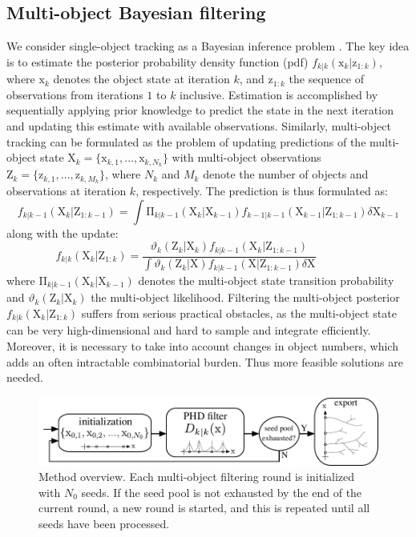 \subsection{Multi-object Bayesian filtering} 
\label{ssec:multi-obj-bay-filt}
We consider single-object tracking as a Bayesian inference problem \cite{bar2004estimation, sarkka2013bayesian}. The key idea is to estimate the posterior probability density function (pdf) $f_{k|k}(\mathrm{x}_k | \mathrm{z}_{1:k})$, where $\mathrm{x}_k$ denotes the object state at iteration $k$, and $\mathrm{z}_{1:k}$ the sequence of observations from iterations $1$ to $k$ inclusive. Estimation is accomplished by sequentially applying prior knowledge to predict the state in the next iteration and updating this estimate with available observations. Similarly, multi-object tracking can be formulated as the problem of updating predictions of the multi-object state $\mathrm{X}_k = \{\mathrm{x}_{k,1},\ldots,\mathrm{x}_{k,N_k}\}$ with multi-object observations $\mathrm{Z}_k = \{\mathrm{z}_{k,1},\ldots,\mathrm{z}_{k,M_k}\}$, where $N_k$ and $M_k$ denote the number of objects and observations at iteration $k$, respectively. The prediction is thus formulated as:
\begin{equation}
f_{k|k-1}(\mathrm{X}_k | \mathrm{Z}_{1:k-1}) = 
\int\!\mathrm{\Pi}_{k|k-1}(\mathrm{X}_k | \mathrm{X}_{k-1}) f_{k-1|k-1}(\mathrm{X}_{k-1}|\mathrm{Z}_{1:k-1}) \delta\mathrm{X}_{k-1}
\label{eq:prediction}
\end{equation}
along with the update:
\begin{equation}
f_{k|k}(\mathrm{X}_k|\mathrm{Z}_{1:k}) =
\frac{\vartheta_k(\mathrm{Z}_k|\mathrm{X}_k) f_{k|k-1}(\mathrm{X}_k|\mathrm{Z}_{1:k-1})}{\int\!\vartheta_k(\mathrm{Z}_k|\mathrm{X})f_{k|k-1}(\mathrm{X}|\mathrm{Z}_{1:k-1}) \delta\mathrm{X}}\qquad\qquad
\label{eq:update}
\end{equation}
where $\mathrm{\Pi}_{k|k-1}(\mathrm{X}_k | \mathrm{X}_{k-1})$ denotes the multi-object state transition probability and $\vartheta_k(\mathrm{Z}_k|\mathrm{X}_k)$ the multi-object likelihood. Filtering the multi-object posterior $f_{k|k}(\mathrm{X}_k | \mathrm{Z}_{1:k})$ suffers from serious practical obstacles, as the multi-object state can be very high-dimensional and hard to sample and integrate efficiently. Moreover, it is necessary to take into account changes in object numbers, which adds an often intractable combinatorial burden. Thus more feasible solutions are needed.
\begin{figure}
	\centering
	\includegraphics[width=0.8\linewidth]{fig1}
	\caption{Method overview. Each multi-object filtering round is initialized with $N_0$ seeds. If the seed pool is not exhausted by the end of the current round, a new round is started, and this is repeated until all seeds have been processed.}
	\label{fig1}
\end{figure}
